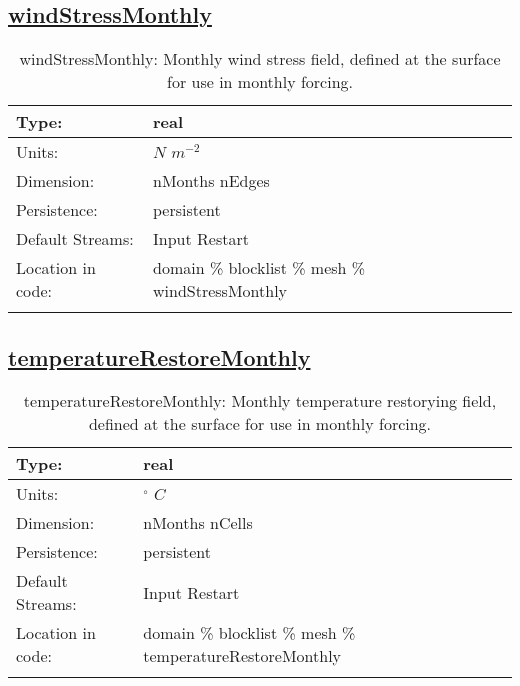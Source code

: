 \subsection[windStressMonthly]{\hyperref[sec:var_tab_mesh]{windStressMonthly}}
\label{subsec:var_sec_mesh_windStressMonthly}
\begin{center}
\begin{longtable}{| p{2.0in} | p{4.0in} |}
        \hline 
        Type: & real \\
        \hline 
        Units: & $N$ $m^{-2}$ \\
        \hline 
        Dimension: & nMonths nEdges \\
        \hline 
        Persistence: & persistent \\
        \hline 
		 Default Streams: & Input Restart  \\
        \hline 
		 Location in code: & domain \% blocklist \% mesh \% windStressMonthly \\
		 \hline 
    \caption{windStressMonthly: Monthly wind stress field, defined at the surface for use in monthly forcing.}
\end{longtable}
\end{center}
\subsection[temperatureRestoreMonthly]{\hyperref[sec:var_tab_mesh]{temperatureRestoreMonthly}}
\label{subsec:var_sec_mesh_temperatureRestoreMonthly}
\begin{center}
\begin{longtable}{| p{2.0in} | p{4.0in} |}
        \hline 
        Type: & real \\
        \hline 
        Units: & $^\circ$ $C$ \\
        \hline 
        Dimension: & nMonths nCells \\
        \hline 
        Persistence: & persistent \\
        \hline 
		 Default Streams: & Input Restart  \\
        \hline 
		 Location in code: & domain \% blocklist \% mesh \% temperatureRestoreMonthly \\
		 \hline 
    \caption{temperatureRestoreMonthly: Monthly temperature restorying field, defined at the surface for use in monthly forcing.}
\end{longtable}
\end{center}
